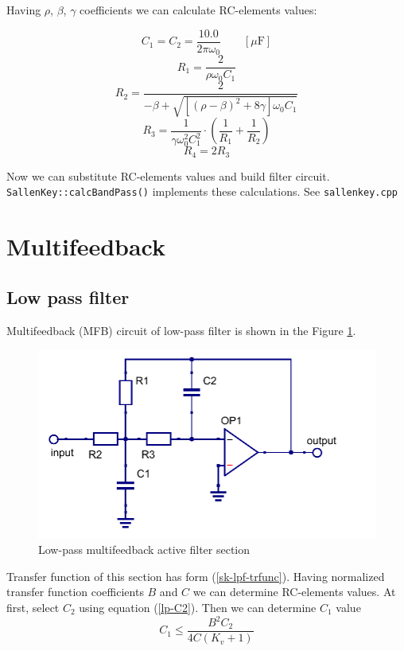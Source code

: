 Having $\rho$, $\beta$, $\gamma$ coefficients we can calculate RC-elements 
values:

\begin{equation}
 C_1=C_2=\frac{10.0}{2\pi\omega_0}\qquad[\mu\mbox{F}]
\end{equation}
\begin{equation}
 R_1 = \frac{2}{\rho\omega_0C_1}
\end{equation}
\begin{equation}
 R_2=\frac{2}{-\beta+\sqrt{[(\rho-\beta)^2+8\gamma]\omega_0C_1}}
\end{equation}
\begin{equation}
 R_3 = 
\frac{1}{\gamma\omega_0^2C_1^2}\cdot\left(\frac{1}{R_1}+\frac{1}{R_2}\right)
\end{equation}
\begin{equation}
 R_4=2R_3
\end{equation}

Now we can substitute RC-elements values and build filter circuit. 
\verb|SallenKey::calcBandPass()| implements these calculations. See 
\verb|sallenkey.cpp|


\section{Multifeedback}

\subsection{Low pass filter}

Multifeedback (MFB) circuit of low-pass filter is shown in the Figure
\ref{fig:mfb-lpf}. 

\begin{figure}[!ht]
  \centering
  \includegraphics[width=0.6\linewidth]{pics/mfb-lpf}
  \caption{Low-pass multifeedback active filter section}
  \label{fig:mfb-lpf}
\end{figure}

Transfer function of this section has form (\ref{sk-lpf-trfunc}). Having
normalized transfer function coefficients $B$ and $C$ we can determine
RC-elements values. At first, select $C_2$ using equation (\ref{lp-C2}). Then
we can determine $C_1$ value
\begin{equation}
 C_1\leq\frac{B^2C_2}{4C(K_v+1)}
\end{equation}

